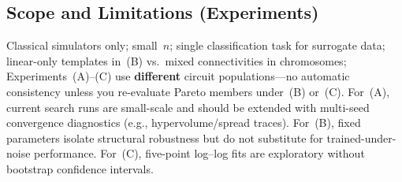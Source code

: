 \subsection{Scope and Limitations (Experiments)}\label{ssec:exp_limits}

Classical simulators only; small~$n$; single classification task for surrogate
data; linear-only templates in~(B) vs.\ mixed connectivities in chromosomes;
Experiments~(A)--(C) use \textbf{different} circuit populations---no automatic
consistency unless you re-evaluate Pareto members under~(B) or~(C).
For~(A), current search runs are small-scale and should be extended with multi-seed
convergence diagnostics (e.g., hypervolume/spread traces). For~(B), fixed
parameters isolate structural robustness but do not substitute for trained-under-
noise performance. For~(C), five-point log--log fits are exploratory without
bootstrap confidence intervals.
